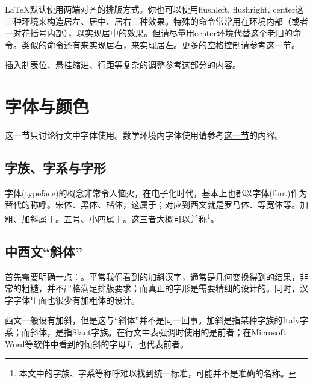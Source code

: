 {\LaTeX 默认使用两端对齐的排版方式。你也可以使用flushleft, flushright, center这三种环境来构造居左、居中、居右三种效果。特殊的\latexline{\\centering}命令常常用在环境内部（或者一对花括号内部），以实现居中的效果。但请尽量用center环境代替这个老旧的命令。类似的命令还有\latexline{\\raggedleft}来实现居右，\latexline{\\raggedright}来实现居左。更多的空格控制请参考\hyperref[sec:hvspace]{这一节}。

插入制表位、悬挂缩进、行距等复杂的调整参考\hyperref[sec:hvspace]{这部分}的内容。

\section{字体与颜色}
\label{sec:font}
这一节只讨论行文中字体使用。数学环境内字体使用请参考\hyperref[sec:mathfont]{这一节}的内容。

\subsection{字族、字系与字形}
字体(typeface)的概念非常令人恼火，在电子化时代，基本上也都以字体(font)作为替代的称呼。宋体、黑体、楷体，这属于；对应到西文就是罗马体、等宽体等。加粗、加斜属于。五号、小四属于。这三者大概可以并称\footnote{本文中的字族、字系等称呼难以找到统一标准，可能并不是准确的名称。}。

\subsection{中西文“斜体”}
首先需要明确一点：。平常我们看到的加斜汉字，通常是几何变换得到的结果，非常的粗糙，并不严格满足排版要求；而真正的字形是需要精细的设计的。同时，汉字字体里面也很少有加粗体的设计。

西文一般设有加斜，但是这与“斜体”并不是同一回事。加斜是指某种字族的Italy字系；而斜体，是指Slant字族。在行文中表强调时使用的是前者；在Microsoft Word等软件中看到的倾斜的字母\textit{I}，也代表前者。

}
